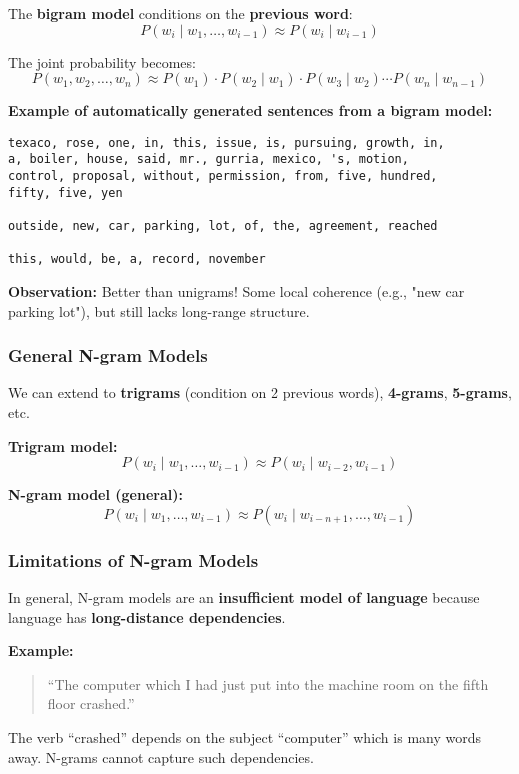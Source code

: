 \documentclass[11pt,a4paper]{article}
\theoremstyle{definition}
\theoremstyle{plain}
\theoremstyle{remark}
\begin{document}
The \textbf{bigram model} conditions on the \textbf{previous word}:
\[
P(w_i \mid w_1, \ldots, w_{i-1}) \approx P(w_i \mid w_{i-1})
\]

The joint probability becomes:
\[
P(w_1, w_2, \ldots, w_n) \approx P(w_1) \cdot P(w_2 \mid w_1) \cdot P(w_3 \mid w_2) \cdots P(w_n \mid w_{n-1})
\]

\textbf{Example of automatically generated sentences from a bigram model:}

\begin{verbatim}
texaco, rose, one, in, this, issue, is, pursuing, growth, in, 
a, boiler, house, said, mr., gurria, mexico, 's, motion, 
control, proposal, without, permission, from, five, hundred, 
fifty, five, yen

outside, new, car, parking, lot, of, the, agreement, reached

this, would, be, a, record, november
\end{verbatim}

\textbf{Observation:} Better than unigrams! Some local coherence (e.g., "new car parking lot"), but still lacks long-range structure.

\subsubsection{General N-gram Models}

We can extend to \textbf{trigrams} (condition on 2 previous words), \textbf{4-grams}, \textbf{5-grams}, etc.

\textbf{Trigram model:}
\[
P(w_i \mid w_1, \ldots, w_{i-1}) \approx P(w_i \mid w_{i-2}, w_{i-1})
\]

\textbf{N-gram model (general):}
\[
P(w_i \mid w_1, \ldots, w_{i-1}) \approx P(w_i \mid w_{i-n+1}, \ldots, w_{i-1})
\]

\subsubsection{Limitations of N-gram Models}

In general, N-gram models are an \textbf{insufficient model of language} because language has \textbf{long-distance dependencies}.

\textbf{Example:}
\begin{quote}
``The computer which I had just put into the machine room on the fifth floor crashed.''
\end{quote}

The verb ``crashed'' depends on the subject ``computer'' which is many words away. N-grams cannot capture such dependencies.
\end{document}
